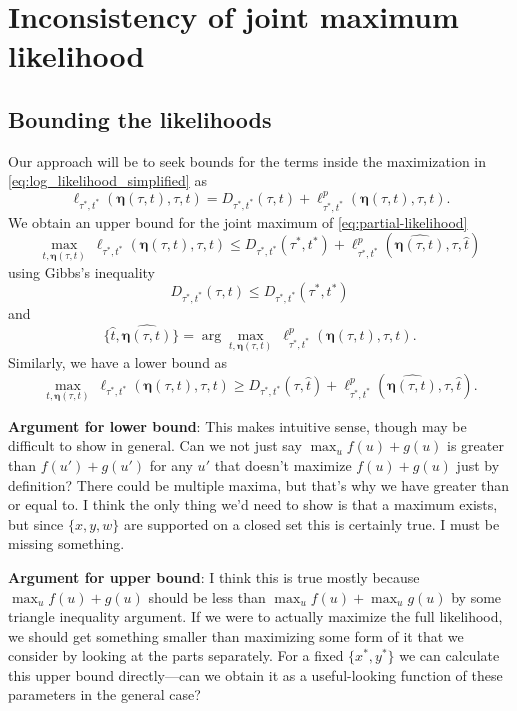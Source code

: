 \documentclass[a4paper]{article}
\newcommand{\fullAncestralSplitPartitions}{\boldsymbol\eta}
\newcommand{\shannonDivergence}{D}
\begin{document}
\section{Inconsistency of joint maximum likelihood}

\subsection{Bounding the likelihoods}

Our approach will be to seek bounds for the terms inside the maximization in \eqref{eq:log_likelihood_simplified} as
\begin{equation}
\label{eq:partial-likelihood}
\ell_{\tau^*,t^*}(\fullAncestralSplitPartitions(\tau,t),\tau,t) = \shannonDivergence_{\tau^*,t^*}(\tau,t) + \ell^p_{\tau^*,t^*}(\fullAncestralSplitPartitions(\tau,t),\tau,t).
\end{equation}
We obtain an upper bound for the joint maximum of \eqref{eq:partial-likelihood}
$$
\max_{t,\fullAncestralSplitPartitions(\tau,t)} \ \ell_{\tau^*,t^*}(\fullAncestralSplitPartitions(\tau,t),\tau,t) \le
    \shannonDivergence_{\tau^*,t^*}(\tau^*,t^*)
    + \ell^p_{\tau^*,t^*}(\widehat{\fullAncestralSplitPartitions(\tau,t)},\tau,\hat{t})
$$
using Gibbs's inequality
$$
\shannonDivergence_{\tau^*,t^*}(\tau,t) \le \shannonDivergence_{\tau^*,t^*}(\tau^*,t^*)
$$
and
$$
\{\hat{t},\widehat{\fullAncestralSplitPartitions(\tau,t)}\} = \arg\max_{t,\fullAncestralSplitPartitions(\tau,t)} \ \ell^p_{\tau^*,t^*}(\fullAncestralSplitPartitions(\tau,t),\tau,t).
$$
Similarly, we have a lower bound as
$$
\max_{t,\fullAncestralSplitPartitions(\tau,t)} \ \ell_{\tau^*,t^*}(\fullAncestralSplitPartitions(\tau,t),\tau,t) \ge
    \shannonDivergence_{\tau^*,t^*}(\tau,\hat{t})
    + \ell^p_{\tau^*,t^*}(\widehat{\fullAncestralSplitPartitions(\tau,t)},\tau,\hat{t}).
$$

\textbf{Argument for lower bound}: This makes intuitive sense, though may be difficult to show in general.
Can we not just say $\max_u f(u) + g(u)$ is greater than $f(u') + g(u')$ for any $u'$ that doesn't maximize $f(u) + g(u)$ just by definition?
There could be multiple maxima, but that's why we have greater than or equal to.
I think the only thing we'd need to show is that a maximum exists, but since $\{x,y,w\}$ are supported on a closed set this is certainly true.
I must be missing something.

\textbf{Argument for upper bound}: I think this is true mostly because $\max_u f(u) + g(u)$ should be less than $\max_u f(u) + \max_u g(u)$ by some triangle inequality argument.
If we were to actually maximize the full likelihood, we should get something smaller than maximizing some form of it that we consider by looking at the parts separately.
For a fixed $\{x^*, y^*\}$ we can calculate this upper bound directly---can we obtain it as a useful-looking function of these parameters in the general case?
\end{document}
